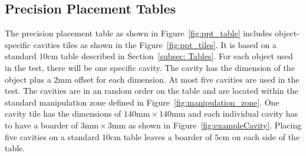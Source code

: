 \subsection{Precision Placement Tables}\label{sec:Precision Placement}

The precision placement table as shown in Figure~\ref{fig:ppt_table} includes object-specific cavities tiles as shown in the Figure~\ref{fig:ppt_tiles}. It is based on a standard $10\si{\centi\meter}$ table described in Section~\ref{subsec: Tables}. For each object used in the test, there will be one specific cavity. The cavity has the dimension of the object plus a $2 \si{\milli\meter}$ offset for each dimension. At most five cavities are used in the test. The cavities are in an random order on the table and are located within the standard manipulation zone defined in Figure~\ref{fig:manipulation_zone}. One cavity tile has the dimensions of $140 \si{\milli\meter} \times 140 \si{\milli\meter} $ and each individual cavity has to have a boarder of $3\si{\milli\meter} \times 3\si{\milli\meter}$ as shown in Figure~\ref{fig:exampleCavity}. Placing five cavities on a standard $10\si{\centi\meter}$ table leaves a boarder of $5 \si{\centi\meter}$ on each side of the table.

